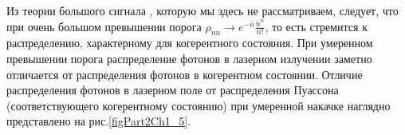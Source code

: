 



Из теории большого сигнала \cite{bScally1974}, которую мы здесь
не рассматриваем, следует, что при очень большом превышении порога 
$\rho_{nn} \rightarrow e^{-\bar{n}}\frac{\bar{n}^n}{n!}$, то есть стремится 
к распределению, характерному для когерентного состояния. При
умеренном превышении порога распределение фотонов в лазерном излучении 
заметно отличается от распределения фотонов в когерентном
состоянии. Отличие распределения фотонов в лазерном поле от
распределения Пуассона (соответствующего когерентному состоянию) при
умеренной накачке наглядно представлено на рис.\ref{figPart2Ch1_5}.
